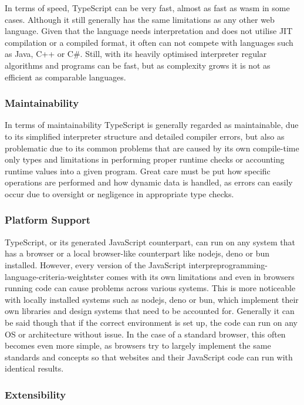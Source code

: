 In terms of speed, TypeScript can be very fast, almost as fast as \acrshort{wasm} in some cases. Although it still generally has the same limitations as any other web language. Given that the language needs interpretation and does not utilise JIT compilation or a compiled format, it often can not compete with languages such as Java, C++ or C\#. Still, with its heavily optimised interpreter regular algorithms and programs can be fast, but as complexity grows it is not as efficient as comparable languages.

\subsubsection{Maintainability}

In terms of maintainability TypeScript is generally regarded as maintainable, due to its simplified interpreter structure and detailed compiler errors, but also as problematic due to its common problems that are caused by its own compile-time only types and limitations in performing proper runtime checks or accounting runtime values into a given program. Great care must be put how specific operations are performed and how dynamic data is handled, as errors can easily occur due to oversight or negligence in appropriate type checks.

\subsubsection{Platform Support}

TypeScript, or its generated JavaScript counterpart, can run on any system that has a browser or a local browser-like counterpart like \Gls{nodejs}, \Gls{deno} or \Gls{bun} installed. However, every version of the JavaScript interpreprogramming-language-criteria-weightster comes with its own limitations and even in browsers running code can cause problems across various systems. This is more noticeable with locally installed systems such as \Gls{nodejs}, \Gls{deno} or \Gls{bun}, which implement their own libraries and design systems that need to be accounted for. Generally it can be said though that if the correct environment is set up, the code can run on any OS or architecture without issue. In the case of a standard browser, this often becomes even more simple, as browsers try to largely implement the same standards and concepts so that websites and their JavaScript code can run with identical results.

\subsubsection{Extensibility}


